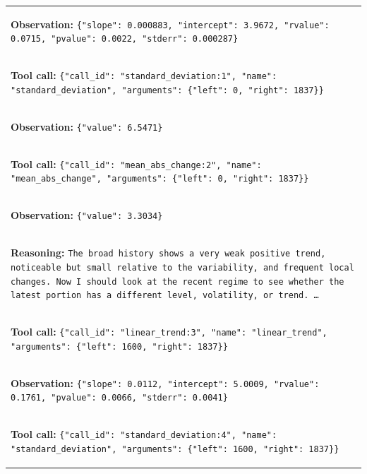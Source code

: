\documentclass[11pt]{article}
\begin{document}
\begin{table}[t]
\begin{tabular}{p{}}
\colorbox{blue!10}{\parbox{0.95\textwidth}{%
\textbf{Observation:}
\texttt{\{"slope": 0.000883, "intercept": 3.9672, "rvalue": 0.0715,
"pvalue": 0.0022, "stderr": 0.000287\}}
}} \\

\hdashline

\colorbox{red!10}{\parbox{0.95\textwidth}{%
\textbf{Tool call:}
\texttt{\{"call\_id": "standard\_deviation:1", "name":
"standard\_deviation", "arguments": \{"left": 0, "right": 1837\}\}}
}} \\

\colorbox{blue!10}{\parbox{0.95\textwidth}{%
\textbf{Observation:}
\texttt{\{"value": 6.5471\}}
}} \\

\hdashline

\colorbox{red!10}{\parbox{0.95\textwidth}{%
\textbf{Tool call:}
\texttt{\{"call\_id": "mean\_abs\_change:2", "name": "mean\_abs\_change",
"arguments": \{"left": 0, "right": 1837\}\}}
}} \\

\colorbox{blue!10}{\parbox{0.95\textwidth}{%
\textbf{Observation:}
\texttt{\{"value": 3.3034\}}
}} \\

\hdashline

\colorbox{green!10}{\parbox{0.95\textwidth}{%
\textbf{Reasoning:}
\texttt{The broad history shows a very weak positive trend, noticeable but
small relative to the variability, and frequent local changes. Now I should
look at the recent regime to see whether the latest portion has a different
level, volatility, or trend. \ldots}
}} \\

\hdashline

\colorbox{red!10}{\parbox{0.95\textwidth}{%
\textbf{Tool call:}
\texttt{\{"call\_id": "linear\_trend:3", "name": "linear\_trend",
"arguments": \{"left": 1600, "right": 1837\}\}}
}} \\

\colorbox{blue!10}{\parbox{0.95\textwidth}{%
\textbf{Observation:}
\texttt{\{"slope": 0.0112, "intercept": 5.0009, "rvalue": 0.1761,
"pvalue": 0.0066, "stderr": 0.0041\}}
}} \\

\hdashline

\colorbox{red!10}{\parbox{0.95\textwidth}{%
\textbf{Tool call:}
\texttt{\{"call\_id": "standard\_deviation:4", "name":
"standard\_deviation", "arguments": \{"left": 1600, "right": 1837\}\}}
}} \\


\end{tabular}
\end{table}
\end{document}

